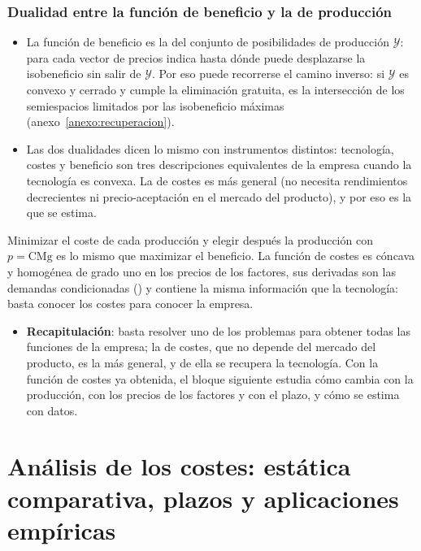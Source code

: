 \documentclass[11pt]{article}
\begin{document}
\subsubsection{Dualidad entre la función de beneficio y la de producción}\label{sec:dualidad-funcion-beneficio}

\begin{itemize}
\item La función de beneficio es la  del conjunto de posibilidades de producción $\mathcal{Y}$: para cada vector de precios indica hasta dónde puede desplazarse la isobeneficio sin salir de $\mathcal{Y}$. Por eso puede recorrerse el camino inverso: si $\mathcal{Y}$ es convexo y cerrado y cumple la eliminación gratuita, es la intersección de los semiespacios limitados por las isobeneficio máximas (anexo~\ref{anexo:recuperacion}).
\item Las dos dualidades dicen lo mismo con instrumentos distintos: tecnología, costes y beneficio son tres descripciones equivalentes de la empresa cuando la tecnología es convexa. La de costes es más general (no necesita rendimientos decrecientes ni precio-aceptación en el mercado del producto), y por eso es la que se estima.
\end{itemize}

\begin{ideaclave}
Minimizar el coste de cada producción y elegir después la producción con $p=\mathrm{CMg}$ es lo mismo que maximizar el beneficio. La función de costes es cóncava y homogénea de grado uno en los precios de los factores, sus derivadas son las demandas condicionadas () y contiene la misma información que la tecnología: basta conocer los costes para conocer la empresa.
\end{ideaclave}

\begin{itemize}
\item \textbf{Recapitulación}: basta resolver uno de los problemas para obtener todas las funciones de la empresa; la de costes, que no depende del mercado del producto, es la más general, y de ella se recupera la tecnología. Con la función de costes ya obtenida, el bloque siguiente estudia cómo cambia con la producción, con los precios de los factores y con el plazo, y cómo se estima con datos.
\end{itemize}


\section{Análisis de los costes: estática comparativa,\cortetitulo{} plazos y aplicaciones empíricas}\label{sec:analisis-costes-estatica}
\end{document}
